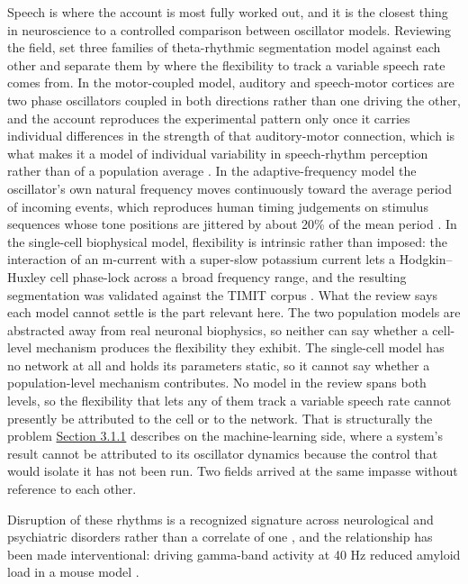 \documentclass[a4paper,fleqn]{cas-sc}
\begin{document}
Speech is where the account is most fully worked out, and it is the
closest thing in neuroscience to a controlled comparison between
oscillator models. Reviewing the field, \citet{dogonasheva2026} set
three families of theta-rhythmic segmentation model against each other
and separate them by where the flexibility to track a variable speech
rate comes from. In the motor-coupled model, auditory and speech-motor
cortices are two phase oscillators coupled in both directions rather
than one driving the other, and the account reproduces the experimental
pattern only once it carries individual differences in the strength of
that auditory-motor connection, which is what makes it a model of
individual variability in speech-rhythm perception rather than of a
population average \citep{assaneo2020}. In the adaptive-frequency model
the oscillator's own natural frequency moves continuously toward the
average period of incoming events, which reproduces human timing
judgements on stimulus sequences whose tone positions are jittered by
about 20\% of the mean period \citep{doelling2023}. In the single-cell
biophysical model, flexibility is intrinsic rather than imposed: the
interaction of an m-current with a super-slow potassium current lets a
Hodgkin--Huxley cell phase-lock across a broad frequency range, and the
resulting segmentation was validated against the TIMIT corpus
\citep{pittman-polletta2021}. What the review says each model cannot
settle is the part relevant here. The two population models are
abstracted away from real neuronal biophysics, so neither can say
whether a cell-level mechanism produces the flexibility they exhibit.
The single-cell model has no network at all and holds its parameters
static, so it cannot say whether a population-level mechanism
contributes. No model in the review spans both levels, so the
flexibility that lets any of them track a variable speech rate cannot
presently be attributed to the cell or to the network. That is
structurally the problem \hyperref[sec-3-1-1]{Section 3.1.1} describes
on the machine-learning side, where a system's result cannot be
attributed to its oscillator dynamics because the control that would
isolate it has not been run. Two fields arrived at the same impasse
without reference to each other.

Disruption of these rhythms is a recognized signature across
neurological and psychiatric disorders rather than a correlate of one
\citep{uhlhaas2006}, and the relationship has been made interventional:
driving gamma-band activity at 40 Hz reduced amyloid load in a mouse
model \citep{iaccarino2016}.
\end{document}

